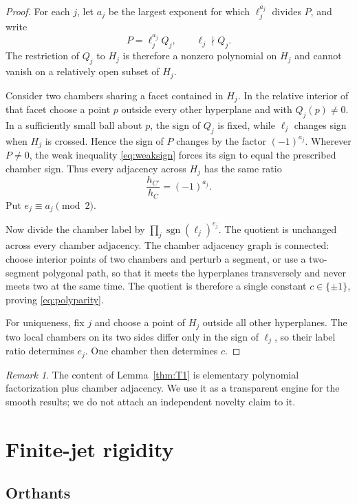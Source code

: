 \documentclass[11pt]{article}
\theoremstyle{definition}
\theoremstyle{remark}
\newtheorem{remark}[theorem]{Remark}
\newcommand{\sign}{\operatorname{sgn}}
\begin{document}
\begin{proof}
For each $j$, let $a_j$ be the largest exponent for which $\ell_j^{a_j}$ divides $P$, and write
\[
 P=\ell_j^{a_j}Q_j,
 \qquad \ell_j\nmid Q_j.
\]
The restriction of $Q_j$ to $H_j$ is therefore a nonzero polynomial on $H_j$ and cannot vanish on a relatively open subset of $H_j$.

Consider two chambers sharing a facet contained in $H_j$. In the relative interior of that facet choose a point $p$ outside every other hyperplane and with $Q_j(p)\ne0$. In a sufficiently small ball about $p$, the sign of $Q_j$ is fixed, while $\ell_j$ changes sign when $H_j$ is crossed. Hence the sign of $P$ changes by the factor $(-1)^{a_j}$. Wherever $P\ne0$, the weak inequality \eqref{eq:weaksign} forces its sign to equal the prescribed chamber sign. Thus every adjacency across $H_j$ has the same ratio
\[
 \frac{h_{C'}}{h_C}=(-1)^{a_j}.
\]
Put $e_j\equiv a_j\pmod2$.

Now divide the chamber label by $\prod_j\sign(\ell_j)^{e_j}$. The quotient is unchanged across every chamber adjacency. The chamber adjacency graph is connected: choose interior points of two chambers and perturb a segment, or use a two-segment polygonal path, so that it meets the hyperplanes transversely and never meets two at the same time. The quotient is therefore a single constant $c\in\{\pm1\}$, proving \eqref{eq:polyparity}.

For uniqueness, fix $j$ and choose a point of $H_j$ outside all other hyperplanes. The two local chambers on its two sides differ only in the sign of $\ell_j$, so their label ratio determines $e_j$. One chamber then determines $c$.
\end{proof}

\begin{remark}
The content of Lemma~\ref{thm:T1} is elementary polynomial factorization plus chamber adjacency. We use it as a transparent engine for the smooth results; we do not attach an independent novelty claim to it.
\end{remark}

\section{Finite-jet rigidity}\label{sec:finitejet}

\subsection{Orthants}
\end{document}
